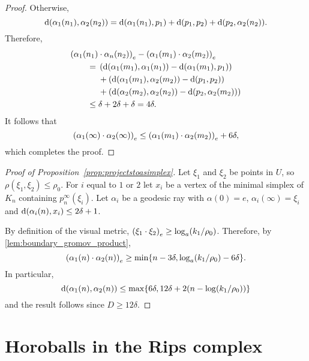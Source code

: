 \documentclass[a4paper]{article}
\begin{document}
\begin{proof}
  Otherwise,
  \begin{equation*}
    \dist(\alpha_1(n_1), \alpha_2(n_2)) = \dist(\alpha_1(n_1), p_1) +
        \dist(p_1, p_2) + \dist(p_2, \alpha_2(n_2)).
  \end{equation*}
  Therefore,
  \begin{align*}
    \mathrlap{\gromov{e}{\alpha_1(n_1)}{\alpha_n(n_2)} - \gromov{e}{\alpha_1(m_1)}{\alpha_2(m_2)}}
    \quad\quad\phantom{{}={}}&\\
           &\mathllap{{}={}}\left(\dist(\alpha_1(m_1), \alpha_1(n_1)) - \dist(\alpha_1(m_1), p_1)\right) \\
           &+ \left(\dist(\alpha_1(m_1), \alpha_2(m_2)) - \dist(p_1, p_2)\right) \\
           &+ \left(\dist(\alpha_2(m_2), \alpha_2(n_2)) - \dist(p_2, \alpha_2(m_2))\right) \\
           &\mathllap{{}\leq{}} \delta+2\delta+\delta=4\delta.
  \end{align*}
  It follows that
  \begin{equation*}
    \gromov{e}{\alpha_1(\infty)}{\alpha_2(\infty)} \leq \gromov{e}{\alpha_1(m_1)}{\alpha_2(m_2)} + 6\delta,
  \end{equation*}
  which completes the proof.
\end{proof}

\begin{proof}[Proof of Proposition~\ref{prop:projectstoasimplex}] 
  Let $\xi_1$ and $\xi_2$ be points in $U$, so $\rho(\xi_1, \xi_2)
  \leq \rho_0$.  For $i$ equal to $1$ or $2$ let $x_i$ be a vertex of the
  minimal simplex of $K_n$ containing $p^\infty_n(\xi_i)$. Let $\alpha_i$ be a
  geodesic ray with $\alpha(0) = e$, $\alpha_i(\infty) = \xi_i$ and
  $\dist(\alpha_i(n), x_i) \leq 2\delta+1$. 
  
  By definition of the visual metric, $\gromov{e}{\xi_1}{\xi_2} \geq
  \log_a(k_1/\rho_0)$. Therefore, by \cref{lem:boundary_gromov_product},
  \begin{equation*}
    \gromov{e}{\alpha_1(n)}{\alpha_2(n)} \geq \min\{n - 3\delta, \log_a(k_1/\rho_0) - 6\delta\}.
  \end{equation*}
  In particular,
  \begin{equation*}
    \dist(\alpha_1(n), \alpha_2(n)) \leq \max\{6\delta, 12\delta + 2(n - \log(k_1/\rho_0))\}
  \end{equation*}
  and the result follows since $D \geq 12\delta$.
\end{proof}

\section{Horoballs in the Rips complex}\label{sec:horoball}
\end{document}
